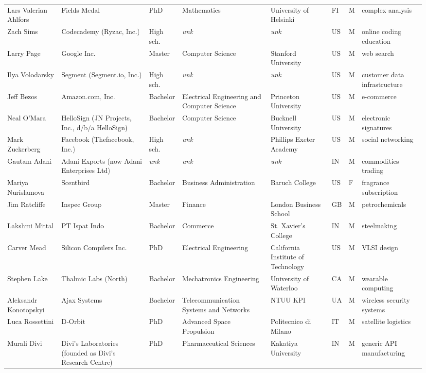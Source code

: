 \documentclass[11pt]{article}
\begin{document}
\begin{longtable}{@{}p{2.4cm}p{2.5cm}p{1.35cm}p{1.9cm}p{2.1cm}p{0.5cm}p{0.45cm}p{2.2cm}@{}}
Lars Valerian Ahlfors & Fields Medal & PhD & Mathematics & University of Helsinki & FI & M & complex analysis \\
Zach Sims & Codecademy (Ryzac, Inc.) & High sch. & \textit{unk} & \textit{unk} & US & M & online coding education \\
Larry Page & Google Inc. & Master & Computer Science & Stanford University & US & M & web search \\
Ilya Volodarsky & Segment (Segment.io, Inc.) & High sch. & \textit{unk} & \textit{unk} & US & M & customer data infrastructure \\
Jeff Bezos & Amazon.com, Inc. & Bachelor & Electrical Engineering and Computer Science & Princeton University & US & M & e-commerce \\
Neal O'Mara & HelloSign (JN Projects, Inc., d/b/a HelloSign) & Bachelor & Computer Science & Bucknell University & US & M & electronic signatures \\
Mark Zuckerberg & Facebook (Thefacebook, Inc.) & High sch. & \textit{unk} & Phillips Exeter Academy & US & M & social networking \\
Gautam Adani & Adani Exports (now Adani Enterprises Ltd) & \textit{unk} & \textit{unk} & \textit{unk} & IN & M & commodities trading \\
Mariya Nurislamova & Scentbird & Bachelor & Business Administration & Baruch College & US & F & fragrance subscription \\
Jim Ratcliffe & Inspec Group & Master & Finance & London Business School & GB & M & petrochemicals \\
Lakshmi Mittal & PT Ispat Indo & Bachelor & Commerce & St. Xavier's College & IN & M & steelmaking \\
Carver Mead & Silicon Compilers Inc. & PhD & Electrical Engineering & California Institute of Technology & US & M & VLSI design \\
Stephen Lake & Thalmic Labs (North) & Bachelor & Mechatronics Engineering & University of Waterloo & CA & M & wearable computing \\
Aleksandr Konotopskyi & Ajax Systems & Bachelor & Telecommunication Systems and Networks & NTUU KPI & UA & M & wireless security systems \\
Luca Rossettini & D-Orbit & PhD & Advanced Space Propulsion & Politecnico di Milano & IT & M & satellite logistics \\
Murali Divi & Divi's Laboratories (founded as Divi's Research Centre) & PhD & Pharmaceutical Sciences & Kakatiya University & IN & M & generic API manufacturing \\

\end{longtable}
\end{document}
